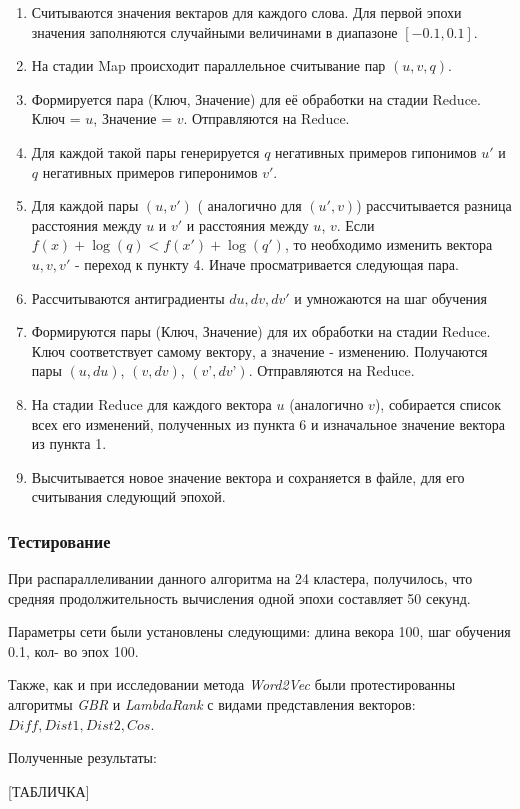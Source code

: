\begin{enumerate}
\item Считываются значения вектаров для каждого слова. Для первой эпохи значения
заполняются случайными величинами в диапазоне $[-0.1, 0.1]$.

\item На стадии Map происходит параллельное считывание пар $(u, v, q)$.

\item Формируется пара (Ключ, Значение) для её обработки на стадии Reduce. Ключ = $u$,
Значение = $v$. Отправляются на Reduce.

\item Для каждой такой пары генерируется $q$ негативных примеров гипонимов $u'$ и $q$
негативных примеров гиперонимов $v'$.

\item Для каждой пары $(u, v')$ ( аналогично для $(u', v)$) рассчитывается разница расстояния между $u$ и $v'$ и расстояния между $u$, $v$. Если $f(x) + \log(q) < f(x') + \log(q')$, то необходимо изменить вектора $u, v, v'$ - переход к пункту 4. Иначе просматривается следующая
пара.

\item Рассчитываются антиградиенты $du, dv, dv'$ и умножаются на шаг обучения

\item Формируются пары (Ключ, Значение) для их обработки на стадии Reduce. Ключ
соответствует самому вектору, а значение - изменению. Получаются пары $(u, du)$, $(v,
dv)$, $(v’, dv’)$. Отправляются на Reduce.

\item На стадии Reduce для каждого вектора $u$ (аналогично $v$), собирается список всех
его изменений, полученных из пункта 6 и изначальное значение вектора из пункта 1.

\item Высчитывается новое значение вектора и сохраняется в файле, для его считывания
следующий эпохой.
\end{enumerate}


\subsubsection{Тестирование}

При распараллеливании данного алгоритма на 24 кластера, получилось, что средняя
продолжительность вычисления одной эпохи составляет 50 секунд.

Параметры сети были установлены следующими: длина векора 100, шаг обучения 0.1, кол-
во эпох 100.

Также, как и при исследовании метода \textit{Word2Vec} были протестированны алгоритмы \textit{GBR} и \textit{LambdaRank} с видами представления векторов: $Diff, Dist1, Dist2, Cos$.

Полученные результаты:

[ТАБЛИЧКА]